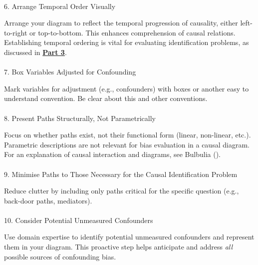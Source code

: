 \documentclass[
  singlecolumn]{article}
\makeatletter
\let\oldparagraph\paragraph
\renewcommand{\paragraph}{
    \@ifstar
      \xxxParagraphStar
      \xxxParagraphNoStar
  }
\newcommand{\xxxParagraphStar}[1]{\oldparagraph*{#1}\mbox{}}
\newcommand{\xxxParagraphNoStar}[1]{\oldparagraph{#1}\mbox{}}
\makeatother
\begin{document}
\paragraph{6. Arrange Temporal Order
Visually}\label{arrange-temporal-order-visually}

Arrange your diagram to reflect the temporal progression of causality,
either left-to-right or top-to-bottom. This enhances comprehension of
causal relations. Establishing temporal ordering is vital for evaluating
identification problems, as discussed in
\hyperref[sec-part3]{\textbf{Part 3}}.

\paragraph{7. Box Variables Adjusted for
Confounding}\label{box-variables-adjusted-for-confounding}

Mark variables for adjustment (e.g., confounders) with boxes or another
easy to understand convention. Be clear about this and other
conventions.

\paragraph{8. Present Paths Structurally, Not
Parametrically}\label{present-paths-structurally-not-parametrically}

Focus on whether paths exist, not their functional form (linear,
non-linear, etc.). Parametric descriptions are not relevant for bias
evaluation in a causal diagram. For an explanation of causal interaction
and diagrams, see Bulbulia ().

\paragraph{9. Minimise Paths to Those Necessary for the Causal
Identification
Problem}\label{minimise-paths-to-those-necessary-for-the-causal-identification-problem}

Reduce clutter by including only paths critical for the specific
question (e.g., back-door paths, mediators).

\paragraph{10. Consider Potential Unmeasured
Confounders}\label{consider-potential-unmeasured-confounders}

Use domain expertise to identify potential unmeasured confounders and
represent them in your diagram. This proactive step helps anticipate and
address \emph{all} possible sources of confounding bias.
\end{document}
